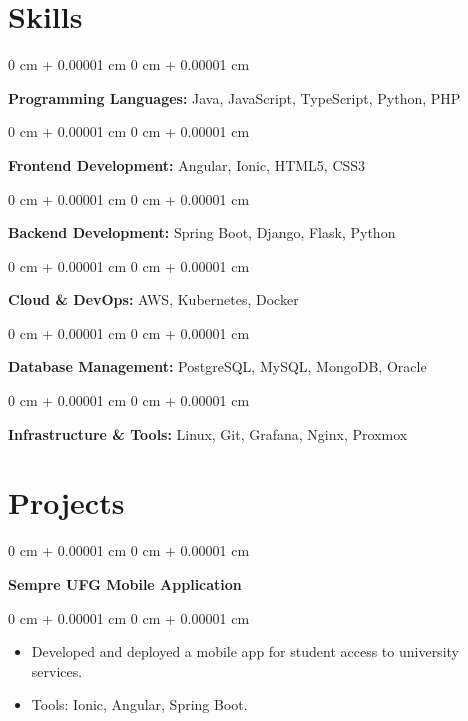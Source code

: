 \documentclass[10pt, letterpaper]{article}
\newenvironment{highlights}{
    \begin{itemize}[
        topsep=0.10 cm,
        parsep=0.10 cm,
        partopsep=0pt,
        itemsep=0pt,
        leftmargin=0 cm + 10pt
    ]
}{
    \end{itemize}
} %
\newenvironment{onecolentry}{
    \begin{adjustwidth}{
        0 cm + 0.00001 cm
    }{
        0 cm + 0.00001 cm
    }
}{
    \end{adjustwidth}
} %
\begin{document}
        \vspace{0.2 cm}

    \section{Skills}
        \begin{onecolentry}
            \textbf{Programming Languages:} Java, JavaScript, TypeScript, Python, PHP
        \end{onecolentry}

        \vspace{0.10 cm}
        \begin{onecolentry}
            \textbf{Frontend Development:} Angular, Ionic, HTML5, CSS3
        \end{onecolentry}

        \vspace{0.10 cm}
        \begin{onecolentry}
            \textbf{Backend Development:} Spring Boot, Django, Flask, Python
        \end{onecolentry}

        \vspace{0.10 cm}
        \begin{onecolentry}
            \textbf{Cloud \& DevOps:} AWS, Kubernetes, Docker
        \end{onecolentry}

        \vspace{0.10 cm}
        \begin{onecolentry}
            \textbf{Database Management:} PostgreSQL, MySQL, MongoDB, Oracle
        \end{onecolentry}

        \vspace{0.10 cm}
        \begin{onecolentry}
            \textbf{Infrastructure \& Tools:} Linux, Git, Grafana, Nginx, Proxmox
        \end{onecolentry}

    \section{Projects}

    \begin{onecolentry}
        \textbf{Sempre UFG Mobile Application}
    \end{onecolentry}
    \vspace{0.10 cm}
    \begin{onecolentry}
        \begin{highlights}
            \item Developed and deployed a mobile app for student access to university services.
            \item Tools: Ionic, Angular, Spring Boot.
        \end{highlights}
    \end{onecolentry}
\end{document}
